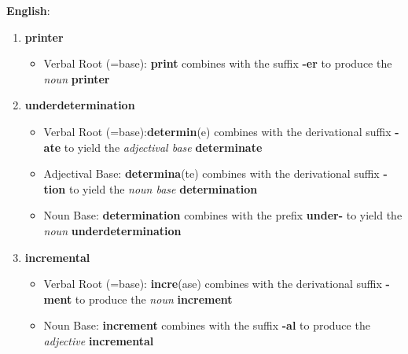 \documentclass[11pt]{article}
\begin{document}
\newpage

\begin{solution}

\textbf{English}:
\begin{enumerate}
	\item \textbf{printer}
		\begin{itemize}
			\item Verbal Root (=base): \textbf{print} combines with the suffix \textbf{-er} to produce the \textit{noun} \textbf{printer}
		\end{itemize}
	\item \textbf{underdetermination}
		\begin{itemize}
			\item Verbal Root (=base):\textbf{determin}(e) combines with the derivational suffix \textbf{-ate} to yield the \textit{adjectival base} \textbf{determinate}
			\item Adjectival Base: \textbf{determina}(te) combines with the derivational suffix \textbf{-tion} to yield the \textit{noun base} \textbf{determination}
			\item Noun Base: \textbf{determination} combines with the prefix \textbf{under-} to yield the \textit{noun} \textbf{underdetermination} 
		\end{itemize}
	\item \textbf{incremental}
		\begin{itemize}
			\item Verbal Root (=base): \textbf{incre}(ase) combines with the derivational suffix \textbf{-ment} to produce the \textit{noun} \textbf{increment}
			\item Noun Base: \textbf{increment} combines with the suffix \textbf{-al} to produce the \textit{adjective} \textbf{incremental}
		\end{itemize}
\end{enumerate}


\end{solution}
\end{document}
